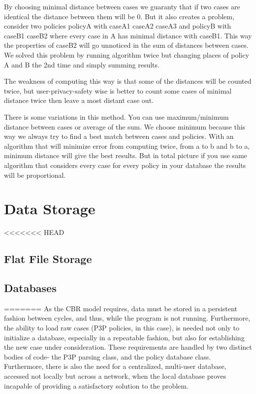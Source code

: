 By choosing minimal distance between cases we guaranty that if two cases are identical the distance between them will be 0. But it also creates a problem, consider two policies policyA with {caseA1 caseA2 caseA3} and policyB with {caseB1 caseB2} where every case in A has minimal distance with caseB1. This way the properties of caseB2 will go unnoticed in the sum of distances between cases. We solved this problem by running algorithm twice but changing places of policy A and B the 2nd time and simply summing results.

The weakness of computing this way is that some of the distances will be counted twice, but user-privacy-safety wise is better to count some cases of minimal distance twice then leave a most distant case out.

There is some variations in this method. You can use maximum/minimum distance between cases or average of the sum. We choose minimum because this way we always try to find a best match between cases and policies. With an algorithm that will minimize error from computing twice, from a to b and b to a, minimum distance will give the best results. But in total picture if you use same algorithm that considers every case for every policy in your database the results will be proportional.




\section{Data Storage}
<<<<<<< HEAD


\subsection{Flat File Storage}



\subsection{Databases}
=======
As the CBR model requires, data must be stored in a persistent fashion between cycles, and thus, while the program is not running. Furthermore, the ability to load raw cases (P3P policies, in this case), is needed not only to initialize a database, especially in a repeatable fashion, but also for establishing the new case under consideration. These requirements are handled by two distinct bodies of code- the P3P parsing class, and the policy database class. Furthermore, there is also the need for a centralized, multi-user database, accessed not locally but across a network, when the local database proves incapable of providing a satisfactory solution to the problem.


